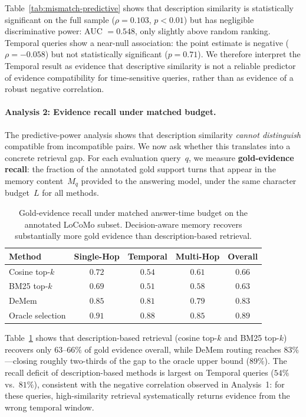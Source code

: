 \documentclass{article}
\theoremstyle{plain}
\theoremstyle{definition}
\theoremstyle{remark}
\begin{document}
\noindent
Table~\ref{tab:mismatch-predictive} shows that description similarity is
statistically significant on the full sample
(\(\rho=0.103\), \(p<0.01\)) but has negligible discriminative power:
AUC \(=0.548\), only slightly above random ranking. Temporal queries show a
near-null association: the point estimate is negative
(\(\rho=-0.058\)) but not statistically significant (\(p=0.71\)). We
therefore interpret the Temporal result as evidence that descriptive
similarity is not a reliable predictor of evidence compatibility for
time-sensitive queries, rather than as evidence of a robust negative
correlation.

\paragraph{Analysis 2: Evidence recall under matched budget.}

The predictive-power analysis shows that description similarity
\emph{cannot distinguish} compatible from incompatible pairs. We now
ask whether this translates into a concrete retrieval gap. For each
evaluation query~$q$, we measure \textbf{gold-evidence recall}: the
fraction of the annotated gold support turns that appear in the
memory content~$M_q$ provided to the answering model, under the same
character budget~$L$ for all methods.

\begin{table}[h]
\centering
\caption{Gold-evidence recall under matched answer-time budget on the
  annotated LoCoMo subset. Decision-aware memory recovers
  substantially more gold evidence than description-based retrieval.}
\label{tab:evidence-recall}
\small
\begin{tabular}{lcccc}
\toprule
Method & Single-Hop & Temporal & Multi-Hop & Overall \\
\midrule
Cosine top-$k$       & $0.72$ & $0.54$ & $0.61$ & $0.66$ \\
BM25 top-$k$         & $0.69$ & $0.51$ & $0.58$ & $0.63$ \\
DeMem       & $0.85$ & $0.81$ & $0.79$ & $0.83$ \\
Oracle selection      & $0.91$ & $0.88$ & $0.85$ & $0.89$ \\
\bottomrule
\end{tabular}
\end{table}

\noindent
Table~\ref{tab:evidence-recall} shows that description-based
retrieval (cosine top-$k$ and BM25 top-$k$) recovers only $63$--$66\%$
of gold evidence overall, while DeMem routing reaches
$83\%$---closing roughly two-thirds of the gap to the oracle upper
bound ($89\%$). The recall deficit of description-based methods is
largest on Temporal queries ($54\%$ vs.\ $81\%$), consistent with the
negative correlation observed in Analysis~1: for these queries,
high-similarity retrieval systematically returns evidence from the
wrong temporal window.
\end{document}
